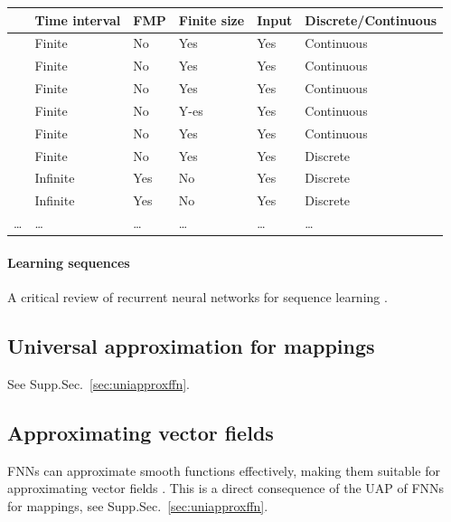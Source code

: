 \documentclass{article}
\theoremstyle{definition}
\theoremstyle{remark}
\newcounter{ct}
\begin{document}
\begin{table}[h]
\begin{tabular}{|l|l|l|l|l|l|}
\cline{2-6}
    \multicolumn{1}{c|}{}
 						&  Time interval & FMP	& Finite size 		&  Input     	&     Discrete/Continuous   \\\cline{2-6}\hline
\citet{cybenko1989approximation} 	& Finite	 & No 		& Yes 			&  Yes		&		Continuous\\\hline  %
\citet{funahashi1989approximate} 	& Finite	 & No		& Yes			&  Yes		&		Continuous\\\hline  %
\citet{hornik1989multilayer} 		& Finite	 & No 		& Yes			& Yes		&		Continuous\\\hline  %
\citet{funahashi1993approximation} 	& Finite	 & No		& Y-es			&  Yes		&		Continuous\\\hline
\citet{jin1995approximation}		& Finite	& No		& Yes			& Yes		&		Continuous	\\\hline
\citet{jin1995universal}			& Finite	& No		& Yes			& Yes		&		Discrete	\\\hline
\citet{bai2019deq} 				& Infinite	& Yes		& No		 	& Yes 		&		Discrete		\\\hline
\citet{schafer2007uap} 			& Infinite 	& Yes		& No			& Yes 		&		Discrete\\\hline
\dots&\dots &\dots&\dots&\dots&\dots\\
\end{tabular}
\end{table}


\paragraph{Learning sequences}
 A critical review of recurrent neural networks for sequence learning \citep{williams1989learning, pearlmutter1989learning, lipton2015rnn}.


\subsection{Universal approximation for mappings}\label{sec:uapmappings}
See Supp.Sec.~\ref{sec:uniapproxffn}.


\subsection{Approximating vector fields}\label{sec:uapvfs}
 FNNs can approximate smooth functions effectively, making them suitable for approximating vector fields \citep{doya1993universality}.
This is a direct consequence of the UAP of FNNs for mappings, see Supp.Sec.~\ref{sec:uniapproxffn}.
\end{document}

